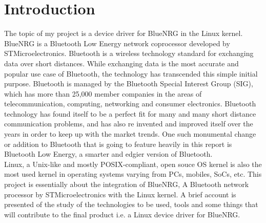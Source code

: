 \section{Introduction}
The topic of my project is a device driver for BlueNRG in the Linux kernel.\\
BlueNRG is a Bluetooth Low Energy network coprocessor developed by STMicroelectronics.
Bluetooth is a wireless technology standard for exchanging data over short distances. While exchanging data is the most accurate and popular use case of Bluetooth, the technology has transcended this simple initial purpose. Bluetooth is managed by the Bluetooth Special Interest Group (SIG), which has more than 25,000 member companies in the areas of telecommunication, computing, networking and consumer electronics. Bluetooth technology has found itself to be a perfect fit for many and many short distance communication problems, and has also re invented and improved itself over the years in order to keep up with the market trends. One such monumental change or addition to Bluetooth that is going to feature heavily in this report is Bluetooth Low Energy, a smarter and edgier version of Bluetooth.\\
Linux, a Unix-like and mostly POSIX-compliant, open souce OS kernel is also the most used kernel in operating systems varying from PCs, mobiles, SoCs, etc. This project is essentially about the integration of BlueNRG, A Bluetooth network processor by STMicroelectronics with the Linux kernel. A brief account is presented of the study of the technologies to be used, tools and some things that will contribute to the final product i.e. a Linux device driver for BlueNRG.
